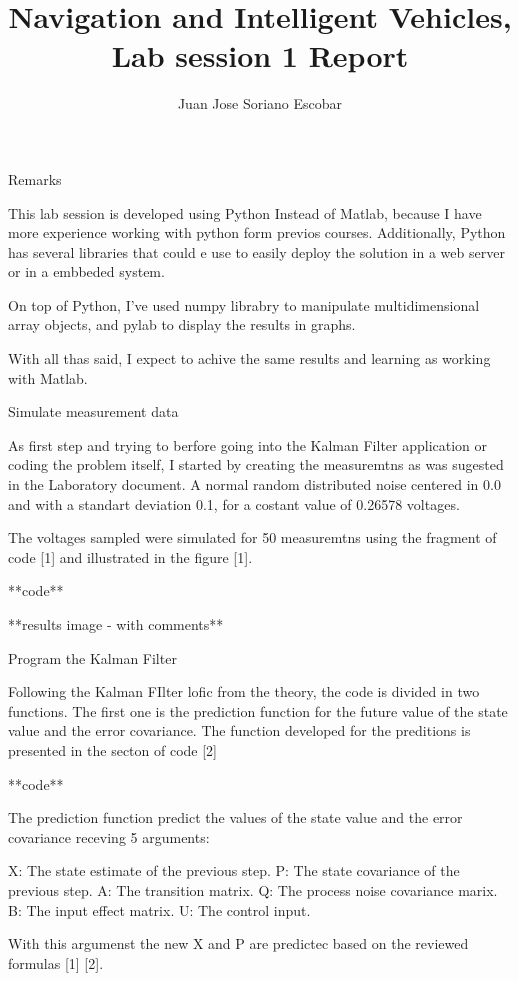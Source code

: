 \documentclass{article}
\begin{document}
    \title{Navigation and Intelligent Vehicles, Lab session 1 Report}
    \author{Juan Jose Soriano Escobar}
    \maketitle

Remarks

This lab session is developed using Python Instead of Matlab, because I have more experience working with python form previos courses. Additionally,
Python has several libraries that could e use to easily deploy the solution in a web server or in a embbeded system.

On top of Python, I've used numpy librabry to manipulate multidimensional array objects, and pylab to display the results in graphs. 

With all thas said, I expect to achive the same results and learning as working with Matlab.

Simulate measurement data

As  first step and trying to berfore going into the Kalman Filter application  or coding the problem itself, I started by creating the measuremtns
as was sugested in the Laboratory document. A normal random distributed noise centered in 0.0 and with a standart deviation 0.1, for a
costant value of 0.26578 voltages.

The voltages sampled were simulated for 50 measuremtns using the fragment of code [1] and illustrated in the figure [1].

**code**

**results image - with comments**

Program the Kalman Filter

Following the Kalman FIlter lofic from the theory, the code is divided in two functions. The first one is the  prediction function for the
future value of the state value and the error covariance. The function developed for the preditions is presented in the secton of code [2]

**code**

The prediction function predict the values of the state value and the error covariance receving 5 arguments:

X: The state estimate of the previous step.
P: The state covariance of the previous step.
A: The transition matrix.
Q: The process noise covariance marix.
B: The input effect matrix.
U: The control input.

With this argumenst the new X and P are predictec based on the reviewed formulas [1] [2].
\end{document}
